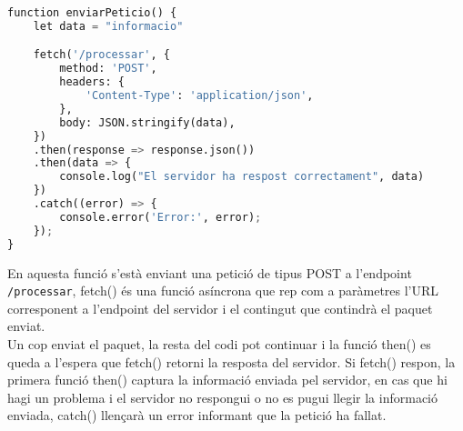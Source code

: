 \begin{lstlisting}[language=Python, caption=Enviar petició]
function enviarPeticio() {
    let data = "informacio"

    fetch('/processar', {
        method: 'POST',
        headers: {
            'Content-Type': 'application/json',
        },
        body: JSON.stringify(data),
    })
    .then(response => response.json())
    .then(data => {
        console.log("El servidor ha respost correctament", data)
    })
    .catch((error) => {
        console.error('Error:', error);
    });
}
\end{lstlisting}

En aquesta funció s'està enviant una petició de tipus POST a l'endpoint \texttt{/processar}, fetch() és una funció asíncrona que rep com a paràmetres l'URL corresponent a l'endpoint del servidor i el contingut que contindrà el paquet enviat.\\
Un cop enviat el paquet, la resta del codi pot continuar i la funció then() es queda a l'espera que fetch() retorni la resposta del servidor. Si fetch() respon, la primera funció then() captura la informació enviada pel servidor, en cas que hi hagi un problema i el servidor no respongui o no es pugui llegir la informació enviada, catch() llençarà un error informant que la petició ha fallat.


